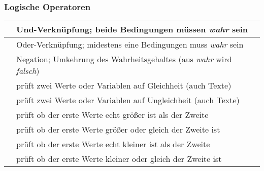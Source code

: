 \documentclass[10pt, a4paper]{arbeitsblatt}
\begin{document}
\subsubsection*{Logische Operatoren}
\begin{tabularx}{\textwidth}{|c|X|} \hline
	\code{and} & Und-Verknüpfung; beide Bedingungen müssen \emph{wahr} sein                     \\ \hline
	\code{or}  & Oder-Verknüpfung; midestens eine Bedingungen muss \emph{wahr} sein             \\ \hline
	\code{not} & Negation; Umkehrung des Wahrheitsgehaltes (aus \emph{wahr} wird \emph{falsch}) \\ \hline
	\code{==}  & prüft zwei Werte oder Variablen auf Gleichheit (auch Texte)                    \\ \hline
	\code{!=}  & prüft zwei Werte oder Variablen auf Ungleichheit (auch Texte)                  \\ \hline
	\code{>}   & prüft ob der erste Werte echt größer ist als der Zweite                        \\ \hline
	\code{>=}  & prüft ob der erste Werte größer oder gleich der Zweite ist                     \\ \hline
	\code{<}   & prüft ob der erste Werte echt kleiner ist als der Zweite                       \\ \hline
	\code{<=}  & prüft ob der erste Werte kleiner oder gleich der Zweite ist                    \\ \hline
\end{tabularx}
\end{document}
